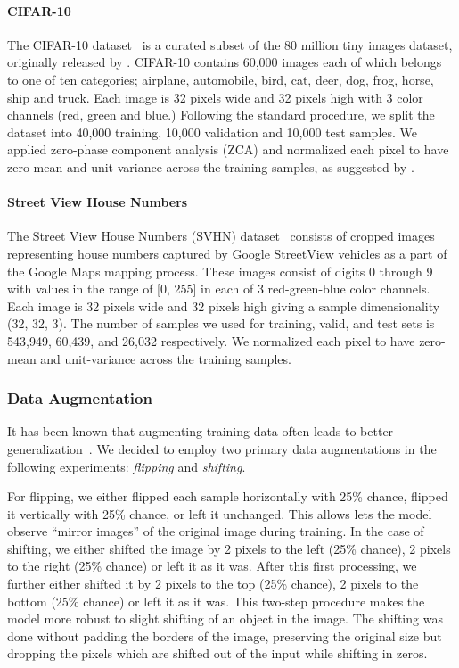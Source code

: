 \paragraph{CIFAR-10}
The CIFAR-10 dataset~\citep{KrizhevskyHinton2009} is a curated subset of the 80
million tiny images dataset, originally released by
\citet{Torralba+Fergus+Freeman-2008}. CIFAR-10 contains 60,000 images each of which
belongs to one of ten categories; airplane, automobile, bird, cat, deer, dog,
frog, horse, ship and truck. Each image is 32 pixels wide and 32 pixels high
with 3 color channels (red, green and blue.) Following the standard procedure,
we split the dataset into 40,000 training, 10,000 validation and 10,000 test
samples. We applied zero-phase component analysis (ZCA) and normalized each pixel
to have zero-mean and unit-variance across the training
samples, as suggested by \citet{KrizhevskyHinton2009}.

\paragraph{Street View House Numbers}
The Street View House Numbers (SVHN) dataset~\citep{Netzer-wkshp-2011} consists
of cropped images representing house numbers captured by Google StreetView
vehicles as a part of the Google Maps mapping process. These images consist of
digits 0 through 9 with values in the range of [0, 255] in each of 3
red-green-blue color channels. Each image is 32 pixels wide and 32 pixels
high giving a sample dimensionality (32, 32, 3). The number of samples we used for
training, valid, and test sets is 543,949, 60,439, and 26,032 respectively. We
normalized each pixel to have zero-mean and unit-variance across the training
samples.

\subsubsection{Data Augmentation}

It has been known that augmenting training data often leads to better
generalization~\citep[see, e.g.,][]{Krizhevsky-2012}. We decided to employ
two primary data augmentations in the following experiments: {\it flipping} and
{\it shifting}.

For flipping, we either flipped each sample horizontally with 25\% chance,
flipped it vertically with 25\% chance, or left it unchanged. This allows lets
the model observe ``mirror images'' of the original image during training.
In the case of shifting, we either shifted the image by 2 pixels to the left
(25\% chance), 2 pixels to the right (25\% chance) or left it as it was. After
this first processing, we further either shifted it by 2 pixels to the top
(25\% chance), 2 pixels to the bottom (25\% chance) or left it as it was. This
two-step procedure makes the model more robust to slight shifting of an object
in the image. The shifting was done without padding the borders of the image,
preserving the original size but dropping the pixels which are shifted out of
the input while shifting in zeros.

